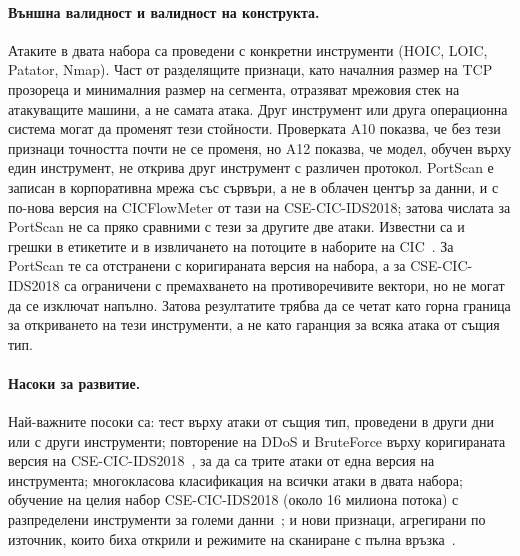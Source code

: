 \paragraph{Външна валидност и валидност на конструкта.} Атаките в двата набора са проведени с конкретни инструменти (HOIC, LOIC, Patator, Nmap). Част от разделящите признаци, като началния размер на TCP прозореца и минималния размер на сегмента, отразяват мрежовия стек на атакуващите машини, а не самата атака. Друг инструмент или друга операционна система могат да променят тези стойности. Проверката A10 показва, че без тези признаци точността почти не се променя, но A12 показва, че модел, обучен върху един инструмент, не открива друг инструмент с различен протокол. PortScan е записан в корпоративна мрежа със сървъри, а не в облачен център за данни, и с по-нова версия на CICFlowMeter от тази на CSE-CIC-IDS2018; затова числата за PortScan не са пряко сравними с тези за другите две атаки. Известни са и грешки в етикетите и в извличането на потоците в наборите на CIC~\cite{engelen2021,liu2022}. За PortScan те са отстранени с коригираната версия на набора, а за CSE-CIC-IDS2018 са ограничени с премахването на противоречивите вектори, но не могат да се изключат напълно. Затова резултатите трябва да се четат като горна граница за откриването на тези инструменти, а не като гаранция за всяка атака от същия тип.

\paragraph{Насоки за развитие.} Най-важните посоки са: тест върху атаки от същия тип, проведени в други дни или с други инструменти; повторение на DDoS и BruteForce върху коригираната версия на CSE-CIC-IDS2018~\cite{liu2022}, за да са трите атаки от една версия на инструмента; многокласова класификация на всички атаки в двата набора; обучение на целия набор CSE-CIC-IDS2018 (около 16 милиона потока) с разпределени инструменти за големи данни~\cite{leevy2020}; и нови признаци, агрегирани по източник, които биха открили и режимите на сканиране с пълна връзка~\cite{neto2023,sharafaldin2018}.
